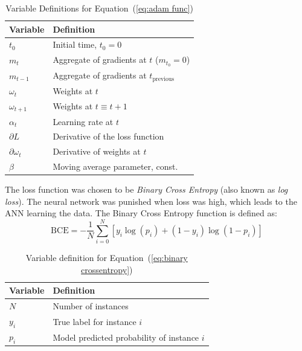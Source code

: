 \documentclass{mcmthesis}
\begin{document}
\begin{table}[H]
\caption{Variable Definitions for Equation~(\ref{eq:adam func})}
\centering
\begin{tabularx}{\textwidth} {
  >{\raggedright\arraybackslash}X 
  >{\raggedright\arraybackslash}X  }
 \hline
 \textbf{Variable} & \textbf{Definition} \\
 \hline\hline
  $t_0$ & Initial time, $t_0 = 0$ \\
 $m_t$ & Aggregate of gradients at $t$ ($m_{t_0}=0$) \\
 $m_{t-1}$ & Aggregate of gradients at $t_\text{previous}$ \\
 $\omega_{t}$ & Weights at $t$ \\ 
 $\omega_{t+1}$ & Weights at $t\equiv t+1$ \\ 
 $\alpha_t$ & Learning rate at $t$ \\ 
 $\partial L$ & Derivative of the loss function \\ 
 $\partial \omega_t$ & Derivative of weights at $t$ \\
 $\beta$ & Moving average parameter, const. \\
 \hline
\end{tabularx}
\end{table}

The loss function was chosen to be \textit{Binary Cross Entropy} (also known as \textit{log loss}). The neural network was punished when loss was high, which leads to the ANN learning the data. The Binary Cross Entropy function is defined as:
\begin{equation}\label{eq:binary crossentropy}
    \text{BCE} = -\frac{1}{N}\sum_{i=0}^{N}\left [y_i \log(p_i) +(1-y_i)\log(1-p_i)\right]
\end{equation}
\begin{table}[!htbp]
\caption{Variable definition for Equation~(\ref{eq:binary crossentropy})}
\centering
\vspace{5pt}
\begin{tabularx}{\textwidth} {
  >{\raggedright\arraybackslash}X 
  >{\raggedright\arraybackslash}X  }
 \hline
 \textbf{Variable} & \textbf{Definition} \\
 \hline\hline
  $N$ & Number of instances \\
  $y_i$ & True label for instance $i$ \\
 $p_i$ & Model predicted probability of instance $i$ \\ \hline
 \end{tabularx}
\end{table}
\end{document}
